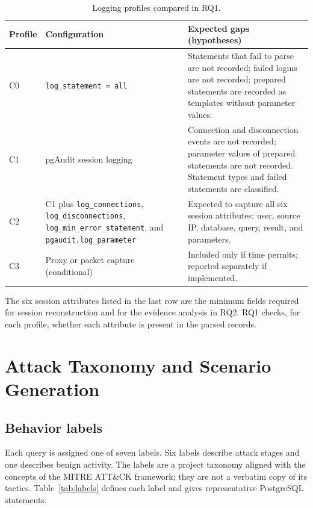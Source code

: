 \documentclass[12pt,a4paper]{report}
\begin{document}
\begin{table}[h]
\centering
\caption{Logging profiles compared in RQ1.}
\label{tab:profiles}
\begin{tabular}{p{1.1cm} p{5.2cm} p{6.2cm}}
\hline
Profile & Configuration & Expected gaps (hypotheses) \\
\hline
C0 & \texttt{log\_statement = all} & Statements that fail to parse are not recorded; failed logins are not recorded; prepared statements are recorded as templates without parameter values. \\
C1 & pgAudit session logging & Connection and disconnection events are not recorded; parameter values of prepared statements are not recorded. Statement types and failed statements are classified. \\
C2 & C1 plus \texttt{log\_connections}, \texttt{log\_disconnections}, \texttt{log\_min\_error\_statement}, and \texttt{pgaudit.log\_parameter} & Expected to capture all six session attributes: user, source IP, database, query, result, and parameters. \\
C3 & Proxy or packet capture (conditional) & Included only if time permits; reported separately if implemented. \\
\hline
\end{tabular}
\end{table}

The six session attributes listed in the last row are the minimum fields required for session reconstruction and for the evidence analysis in RQ2. RQ1 checks, for each profile, whether each attribute is present in the parsed records.

\section{Attack Taxonomy and Scenario Generation}
\subsection{Behavior labels}
Each query is assigned one of seven labels. Six labels describe attack stages and one describes benign activity. The labels are a project taxonomy aligned with the concepts of the MITRE ATT\&CK framework; they are not a verbatim copy of its tactics. Table~\ref{tab:labels} defines each label and gives representative PostgreSQL statements.
\end{document}
